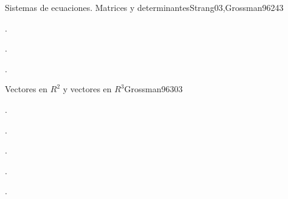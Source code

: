 \begin{syllabus}
\begin{unit}{Sistemas de ecuaciones. Matrices y determinantes}{}{Strang03,Grossman96}{24}{3}
   \begin{learningoutcomes}
      \item .
      \item .
      \item .
     
   \end{learningoutcomes}
\end{unit}

\begin{unit}{Vectores en $R^2$ y vectores en $R^3$}{}{Grossman96}{30}{3}
   \begin{topics}
      \item .
      \item .
   \end{topics}

   \begin{learningoutcomes}
      \item .
      \item .
      \item .
   \end{learningoutcomes}
\end{unit}



\begin{coursebibliography}
\end{coursebibliography}

\end{syllabus}
